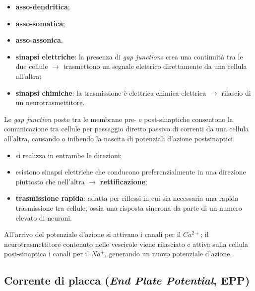 \begin{itemize}
  \item \textbf{asso-dendritica};
  \item \textbf{asso-somatica};
  \item \textbf{asso-assonica}.
\end{itemize}

\begin{itemize}
  \item \textbf{sinapsi elettriche}: la presenza di \textit{gap junctions} crea una continuità tra le due cellule $\rightarrow$ trasmettono un segnale elettrico direttamente da una cellula all'altra;
  \item \textbf{sinapsi chimiche}: la trasmissione è elettrica-chimica-elettrica $\rightarrow$ rilascio di un neurotrasmettitore.
\end{itemize}

Le \textit{gap junction} poste tra le membrane pre- e post-sinaptiche consentono la comunicazione tra cellule per passaggio diretto passivo di correnti da una cellula all'altra, causando o inibendo la nascita di potenziali d'azione postsinaptici.
\begin{itemize}
  \item si realizza in entrambe le direzioni;
  \item esistono sinapsi elettriche che conducono preferenzialmente in una direzione piuttosto che nell'altra $\rightarrow$ \textbf{rettificazione};
  \item \textbf{trasmissione rapida}: adatta per riflessi in cui sia necessaria una rapida trasmissione tra cellule, ossia una risposta sincrona da parte di un numero elevato di neuroni.
\end{itemize}

All'arrivo del potenziale d'azione si attivano i canali per il $Ca^{2+}$; il neurotrasmettitore contenuto nelle vescicole viene rilasciato e attiva sulla cellula post-sinaptica i canali per il $Na^+$, generando un nuovo potenziale d'azione.

\subsection{\texorpdfstring{Corrente di placca (\textit{End Plate Potential}, EPP)}{Corrente di placca (End Plate Potential, EPP)}}

